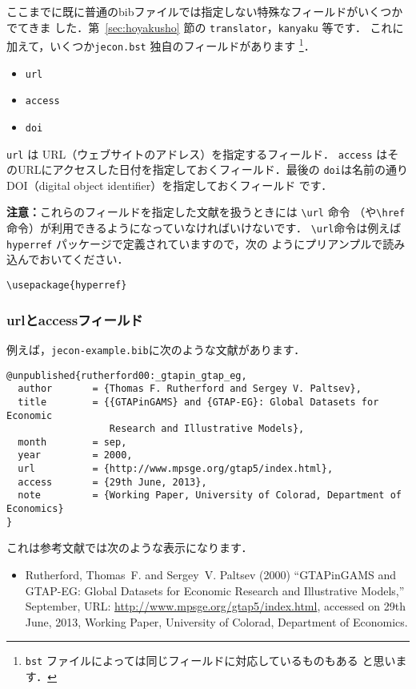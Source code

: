 \documentclass[article]{jlreq}
\begin{document}
ここまでに既に普通のbibファイルでは指定しない特殊なフィールドがいくつかでてきま
した．第~\ref{sec:hoyakusho} 節の \texttt{translator}，\texttt{kanyaku} 等です．
これに加えて，いくつか\texttt{jecon.bst} 独自のフィールドがあります
\footnote{\texttt{bst} ファイルによっては同じフィールドに対応しているものもある
と思います．}．
\begin{itemize}
 \item \texttt{url}
 \item \texttt{access}
 \item \texttt{doi}
\end{itemize}

\texttt{url} は URL（ウェブサイトのアドレス）を指定するフィールド．
\texttt{access} はそのURLにアクセスした日付を指定しておくフィールド．最後の
\texttt{doi}は名前の通りDOI（digital object identifier）を指定しておくフィールド
です．

\begin{screen}
 \textbf{注意：}これらのフィールドを指定した文献を扱うときには \verb|\url| 命令
 （や\verb|\href| 命令）が利用できるようになっていなければいけないです．
 \verb|\url|命令は例えば\texttt{hyperref} パッケージで定義されていますので，次の
 ようにプリアンプルで読み込んでおいてください．
 \begin{verbatim}
\usepackage{hyperref}
 \end{verbatim} 
\end{screen}

\subsubsection{urlとaccessフィールド}

例えば，\texttt{jecon-example.bib}に次のような文献があります．
\begin{verbatim}
@unpublished{rutherford00:_gtapin_gtap_eg,
  author       = {Thomas F. Rutherford and Sergey V. Paltsev},
  title        = {{GTAPinGAMS} and {GTAP-EG}: Global Datasets for Economic
                  Research and Illustrative Models},
  month        = sep,
  year         = 2000,
  url          = {http://www.mpsge.org/gtap5/index.html},
  access       = {29th June, 2013},
  note         = {Working Paper, University of Colorad, Department of Economics}
}
\end{verbatim}

これは参考文献では次のような表示になります．
\begin{screen}
 \begin{itemize}
  \item  Rutherford, Thomas~F. and Sergey~V. Paltsev (2000) ``{GTAPinGAMS} and
 {GTAP-EG}: Global Datasets for Economic Research and Illustrative Models,''
 September, URL: \url{http://www.mpsge.org/gtap5/index.html}, accessed on 29th
 June, 2013, Working Paper, University of Colorad, Department of Economics.
 \end{itemize}
\end{screen}
\end{document}

